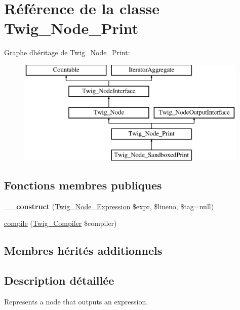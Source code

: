 \hypertarget{class_twig___node___print}{}\section{Référence de la classe Twig\+\_\+\+Node\+\_\+\+Print}
\label{class_twig___node___print}
Graphe d\textquotesingle{}héritage de Twig\+\_\+\+Node\+\_\+\+Print\+:\begin{figure}[H]
\begin{center}
\leavevmode
\includegraphics[height=5.000000cm]{class_twig___node___print}
\end{center}
\end{figure}
\subsection*{Fonctions membres publiques}
\begin{DoxyCompactItemize}
\item 
{\bfseries \+\_\+\+\_\+construct} (\hyperlink{class_twig___node___expression}{Twig\+\_\+\+Node\+\_\+\+Expression} \$expr, \$lineno, \$tag=null)\hypertarget{class_twig___node___print_a3846bdad0632470525ae7d3080f6b188}{}\label{class_twig___node___print_a3846bdad0632470525ae7d3080f6b188}

\item 
\hyperlink{class_twig___node___print_a4e0faa87c3fae583620b84d3607085da}{compile} (\hyperlink{class_twig___compiler}{Twig\+\_\+\+Compiler} \$compiler)
\end{DoxyCompactItemize}
\subsection*{Membres hérités additionnels}


\subsection{Description détaillée}
Represents a node that outputs an expression.

